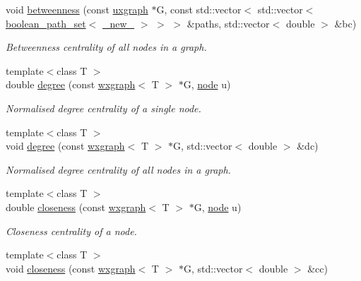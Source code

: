 \begin{DoxyCompactItemize}
void \hyperlink{namespacelgraph_1_1networks_1_1metrics_1_1centralities_ae8016a7511fd3982f986670283cc048c}{betweenness} (const \hyperlink{classlgraph_1_1uxgraph}{uxgraph} $\ast$G, const std\-::vector$<$ std\-::vector$<$ \hyperlink{namespacelgraph_afad432931ba600ab1628d5c9595986c5}{boolean\-\_\-path\-\_\-set}$<$ \hyperlink{namespacelgraph_a2836f966c1c36b43da337d8907728ec0}{\-\_\-new\-\_\-} $>$ $>$ $>$ \&paths, std\-::vector$<$ double $>$ \&bc)
\begin{DoxyCompactList}\small\item\em Betweenness centrality of all nodes in a graph. \end{DoxyCompactList}\item 
{\footnotesize template$<$class T $>$ }\\double \hyperlink{namespacelgraph_1_1networks_1_1metrics_1_1centralities_ab069253de07dc54020e9d6cc1a27a6c8}{degree} (const \hyperlink{classlgraph_1_1wxgraph}{wxgraph}$<$ T $>$ $\ast$G, \hyperlink{namespacelgraph_a397169dd66adf725210a30fb7251773e}{node} u)
\begin{DoxyCompactList}\small\item\em Normalised degree centrality of a single node. \end{DoxyCompactList}\item 
{\footnotesize template$<$class T $>$ }\\void \hyperlink{namespacelgraph_1_1networks_1_1metrics_1_1centralities_a20747beaa4dd97bc96cf153afecc464e}{degree} (const \hyperlink{classlgraph_1_1wxgraph}{wxgraph}$<$ T $>$ $\ast$G, std\-::vector$<$ double $>$ \&dc)
\begin{DoxyCompactList}\small\item\em Normalised degree centrality of all nodes in a graph. \end{DoxyCompactList}\item 
{\footnotesize template$<$class T $>$ }\\double \hyperlink{namespacelgraph_1_1networks_1_1metrics_1_1centralities_a641608dcaecba5d3636237bd15da2e96}{closeness} (const \hyperlink{classlgraph_1_1wxgraph}{wxgraph}$<$ T $>$ $\ast$G, \hyperlink{namespacelgraph_a397169dd66adf725210a30fb7251773e}{node} u)
\begin{DoxyCompactList}\small\item\em Closeness centrality of a node. \end{DoxyCompactList}\item 
{\footnotesize template$<$class T $>$ }\\void \hyperlink{namespacelgraph_1_1networks_1_1metrics_1_1centralities_a070b4de5aa7832b07c860e9527ad5526}{closeness} (const \hyperlink{classlgraph_1_1wxgraph}{wxgraph}$<$ T $>$ $\ast$G, std\-::vector$<$ double $>$ \&cc)

\end{DoxyCompactItemize}
